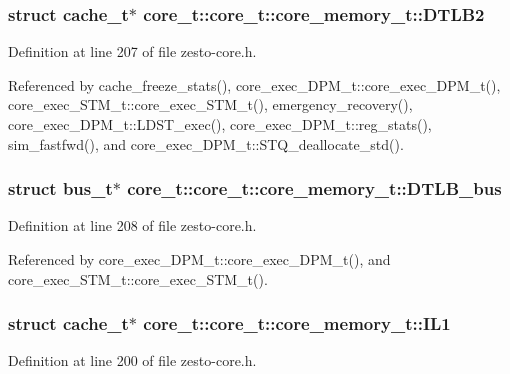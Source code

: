 \subsubsection[{DTLB2}]{\setlength{\rightskip}{0pt plus 5cm}struct {\bf cache\_\-t}$\ast$ core\_\-t::core\_\-t::core\_\-memory\_\-t::DTLB2\hspace{0.3cm}{\tt  [read]}}\label{structcore__t_1_1core__memory__t_e617139a2ae1293e5f62c28d9e1e9e42}




Definition at line 207 of file zesto-core.h.

Referenced by cache\_\-freeze\_\-stats(), core\_\-exec\_\-DPM\_\-t::core\_\-exec\_\-DPM\_\-t(), core\_\-exec\_\-STM\_\-t::core\_\-exec\_\-STM\_\-t(), emergency\_\-recovery(), core\_\-exec\_\-DPM\_\-t::LDST\_\-exec(), core\_\-exec\_\-DPM\_\-t::reg\_\-stats(), sim\_\-fastfwd(), and core\_\-exec\_\-DPM\_\-t::STQ\_\-deallocate\_\-std().
\subsubsection[{DTLB\_\-bus}]{\setlength{\rightskip}{0pt plus 5cm}struct {\bf bus\_\-t}$\ast$ core\_\-t::core\_\-t::core\_\-memory\_\-t::DTLB\_\-bus\hspace{0.3cm}{\tt  [read]}}\label{structcore__t_1_1core__memory__t_5c59f3f4dafe66ce402afea3b3b73b59}




Definition at line 208 of file zesto-core.h.

Referenced by core\_\-exec\_\-DPM\_\-t::core\_\-exec\_\-DPM\_\-t(), and core\_\-exec\_\-STM\_\-t::core\_\-exec\_\-STM\_\-t().
\subsubsection[{IL1}]{\setlength{\rightskip}{0pt plus 5cm}struct {\bf cache\_\-t}$\ast$ core\_\-t::core\_\-t::core\_\-memory\_\-t::IL1\hspace{0.3cm}{\tt  [read]}}\label{structcore__t_1_1core__memory__t_6d174a98e852ec20f0f8a3410d84b4a9}




Definition at line 200 of file zesto-core.h.

